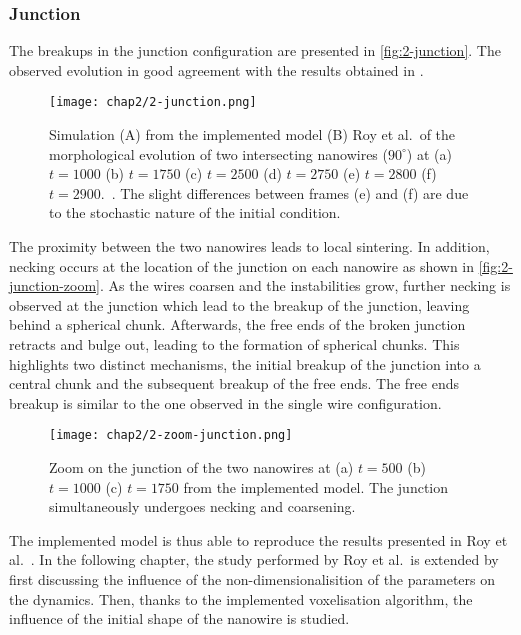     \subsubsection{Junction}
    The breakups in the junction configuration are presented in \autoref{fig:2-junction}. The observed evolution in good agreement with the results obtained in \cite{RoyVarmaGururajan2021}. 
    \begin{figure}
        \centering
        \texttt{[image: chap2/2-junction.png]}
        \caption{Simulation (A) from the implemented model (B) Roy et al.~of the morphological evolution of two intersecting nanowires ($90^\circ$) at (a) $t=1000$ (b) $t=1750$ (c) $t=2500$ (d) $t=2750$ (e) $t=2800$ (f) $t=2900$.\ \cite{RoyVarmaGururajan2021}. The slight differences between frames (e) and (f) are due to the stochastic nature of the initial condition.}
        \label{fig:2-junction}
    \end{figure}
    The proximity between the two nanowires leads to local sintering. In addition, necking occurs at the location of the junction on each nanowire as shown in \autoref{fig:2-junction-zoom}. As the wires coarsen and the instabilities grow, further necking is observed at the junction which lead to the breakup of the junction, leaving behind a spherical chunk. Afterwards, the free ends of the broken junction retracts and bulge out, leading to the formation of spherical chunks. This highlights two distinct mechanisms, the initial breakup of the junction into a central chunk and the subsequent breakup of the free ends. The free ends breakup is similar to the one observed in the single wire configuration.
    \begin{figure}[H]
        \centering
        \texttt{[image: chap2/2-zoom-junction.png]}
        \caption{Zoom on the junction of the two nanowires at (a) $t=500$ (b) $t=1000$ (c) $t=1750$ from the implemented model. The junction simultaneously undergoes necking and coarsening. }
        \label{fig:2-junction-zoom}
    \end{figure}
    The implemented model is thus able to reproduce the results presented in Roy et al.~\cite{RoyVarmaGururajan2021}. In the following chapter, the study performed by Roy et al.~is extended by first discussing the influence of the non-dimensionalisition of the parameters on the dynamics. Then, thanks to the implemented voxelisation algorithm, the influence of the initial shape of the nanowire is studied.
